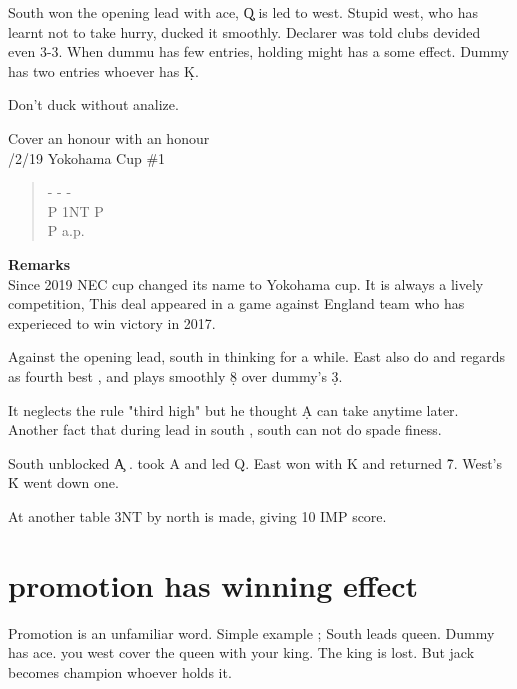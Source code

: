 South won the opening lead with ace, \c Q is led to west.
Stupid west, who has learnt not to take hurry, ducked it
smoothly. Declarer was told clubs devided even 3-3.
When dummu has few entries, holding might has a some
effect. Dummy has two entries whoever has \d K.

Don't duck without analize.

\vspace{0.5cm}
Cover an honour with an honour\\
/2/19 Yokohama Cup \#1
\begin{quote}
%
  {}%
  {}
  {}%
  {}%
\end{quote}
\begin{quote}
\begin{bidding}
- \> -  \> - \s \\
P \> 1NT \> P \s \\
P \s \>  a.p.
\end{bidding}
\end{quote}
{\bf Remarks}\\

Since 2019 NEC cup changed its name to Yokohama cup.
It is always a lively competition, This deal appeared
in a game against England team who has experieced to win
victory in 2017.

Against the opening lead, south in thinking for a while.
East also do and  regards as fourth best ,
and plays smoothly \d 8 over dummy's \d 3.

It neglects the rule "third high" but he thought \d A can take
anytime later. Another fact that during lead in south ,
south can not do spade finess.

South unblocked \c A . took \s A and led \s Q. 
East won with \s K and returned \h 7. West's \h K went down one.

At another table 3NT by north is made, giving 10 IMP score.

\section{promotion has winning effect}
Promotion is an unfamiliar word. Simple example ;
South leads queen. Dummy has ace. you west cover the queen with your
king. The king is lost. But jack becomes champion whoever holds it.

